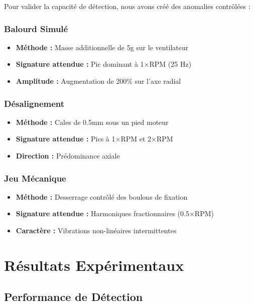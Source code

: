 Pour valider la capacité de détection, nous avons créé des anomalies contrôlées :

\subsubsection{Balourd Simulé}

\begin{itemize}
    \item \textbf{Méthode :} Masse additionnelle de 5g sur le ventilateur
    \item \textbf{Signature attendue :} Pic dominant à 1×RPM (25 Hz)
    \item \textbf{Amplitude :} Augmentation de 200\% sur l'axe radial
\end{itemize}

\subsubsection{Désalignement}

\begin{itemize}
    \item \textbf{Méthode :} Cales de 0.5mm sous un pied moteur
    \item \textbf{Signature attendue :} Pics à 1×RPM et 2×RPM
    \item \textbf{Direction :} Prédominance axiale
\end{itemize}

\subsubsection{Jeu Mécanique}

\begin{itemize}
    \item \textbf{Méthode :} Desserrage contrôlé des boulons de fixation
    \item \textbf{Signature attendue :} Harmoniques fractionnaires (0.5×RPM)
    \item \textbf{Caractère :} Vibrations non-linéaires intermittentes
\end{itemize}

\section{Résultats Expérimentaux}

\subsection{Performance de Détection}

